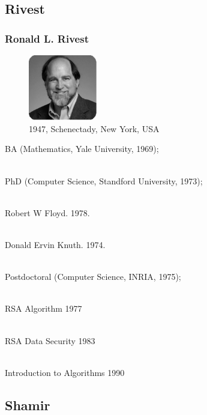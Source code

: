 \documentclass[slidestop,compress,mathserif]{beamer}
\begin{document}
\subsection{\hfill Rivest}
\begin{frame}
  \frametitle{Ronald L. Rivest}
  \begin{multicols}{2}
    \begin{figure}
      \includegraphics[width=3cm]{r.png}
      \caption{1947, Schenectady, New York, USA}
    \end{figure}

\footnotesize

   BA (Mathematics, Yale University, 1969);

    ~\\

   PhD (Computer Science, Standford University, 1973); 

    ~\\

   Robert W Floyd. 1978. 

    ~\\

   Donald Ervin Knuth. 1974. 

    ~\\

   Postdoctoral (Computer Science, INRIA, 1975);
   
   ~\\
   
   RSA Algorithm 1977

    ~\\

   RSA Data Security  1983

    ~\\

   Introduction to Algorithms 1990

    
  \end{multicols}
  
\end{frame}


\subsection{\hfill Shamir}
\end{document}
